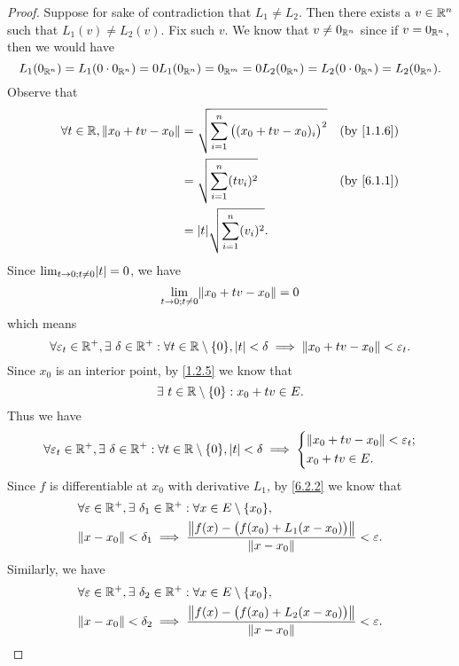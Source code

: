 \begin{proof}
  Suppose for sake of contradiction that \(L_1 \neq L_2\).
  Then there exists a \(v \in \R^n\) such that \(L_1(v) \neq L_2(v)\).
  Fix such \(v\).
  We know that \(v \neq 0_{\R^n}\) since if \(v = 0_{\R^n}\), then we would have
  \[
    L_1(0_{\R^n}) = L_1(0 \cdot 0_{\R^n}) = 0 L_1(0_{\R^n}) = 0_{\R^m} = 0 L_2(0_{\R^n}) = L_2(0 \cdot 0_{\R^n}) = L_2(0_{\R^n}).
  \]
  Observe that
  \begin{align*}
    \forall t \in \R, \norm*{x_0 + tv - x_0} & = \sqrt{\sum_{i = 1}^n \big((x_0 + tv - x_0)_i\big)^2} &  & \by{1.1.6} \\
                                             & = \sqrt{\sum_{i = 1}^n (t v_i)^2}                      &  & \by{6.1.1} \\
                                             & = \abs{t} \sqrt{\sum_{i = 1}^n (v_i)^2}.
  \end{align*}
  Since \(\lim_{t \to 0 ; t \neq 0} \abs{t} = 0\), we have
  \[
    \lim_{t \to 0 ; t \neq 0} \norm*{x_0 + tv - x_0} = 0
  \]
  which means
  \[
    \forall \varepsilon_t \in \R^+, \exists\ \delta \in \R^+ : \forall t \in \R \setminus \{0\}, \abs{t} < \delta \implies \norm*{x_0 + tv - x_0} < \varepsilon_t.
  \]
  Since \(x_0\) is an interior point, by \cref{1.2.5} we know that
  \[
    \exists\ t \in \R \setminus \{0\} : x_0 + tv \in E.
  \]
  Thus we have
  \[
    \forall \varepsilon_t \in \R^+, \exists\ \delta \in \R^+ : \forall t \in \R \setminus \{0\}, \abs{t} < \delta \implies \begin{dcases}
      \norm*{x_0 + tv - x_0} < \varepsilon_t; \\
      x_0 + tv \in E.
    \end{dcases}
  \]
  Since \(f\) is differentiable at \(x_0\) with derivative \(L_1\), by \cref{6.2.2} we know that
  \begin{align*}
     & \forall \varepsilon \in \R^+, \exists\ \delta_1 \in \R^+ : \forall x \in E \setminus \{x_0\},                              \\
     & \norm*{x - x_0} < \delta_1 \implies \dfrac{\norm*{f(x) - \big(f(x_0) + L_1(x - x_0)\big)}}{\norm*{x - x_0}} < \varepsilon.
  \end{align*}
  Similarly, we have
  \begin{align*}
     & \forall \varepsilon \in \R^+, \exists\ \delta_2 \in \R^+ : \forall x \in E \setminus \{x_0\},                              \\
     & \norm*{x - x_0} < \delta_2 \implies \dfrac{\norm*{f(x) - \big(f(x_0) + L_2(x - x_0)\big)}}{\norm*{x - x_0}} < \varepsilon.

\end{align*}
\end{proof}
